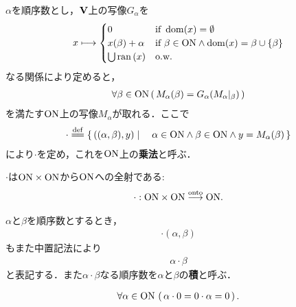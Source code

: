 	\begin{screen}
		\begin{dfn}[順序数の乗法]
			$\alpha$を順序数とし，$\mathbf{V}$上の写像$G_\alpha$を
			\begin{align}
				x \longmapsto 
				\begin{cases}
					0 & \mbox{if } \operatorname{dom}(x) = \emptyset \\
					x(\beta) + \alpha & \mbox{if } \beta \in \mathrm{ON} \wedge \operatorname{dom}(x) = \beta \cup \{\beta\} \\
					\bigcup \operatorname*{ran} \left(x\right) & \mbox{o.w.}
				\end{cases}
			\end{align}
			なる関係により定めると，
			\begin{align}
				\forall \beta \in \mathrm{ON}\, (\, M_\alpha(\beta) = G_\alpha(M_\alpha|_\beta)\, )
			\end{align}
			を満たす$\mathrm{ON}$上の写像$M_\alpha$が取れる．ここで
			\begin{align}
				\cdot \defeq \Set{((\alpha,\beta),y)}{\alpha \in \ON \wedge \beta \in \ON \wedge y = M_\alpha (\beta)}
			\end{align}
			により$\cdot$を定め，これを$\mathrm{ON}$上の{\bf 乗法}と呼ぶ．
		\end{dfn}
	\end{screen}
	
	\begin{screen}
		\begin{thm}\label{thm:multiplication_on_ordinal_numbers_is_a_mapping}
			$\cdot$は$\mathrm{ON} \times \mathrm{ON}$から$\mathrm{ON}$への全射である:
			\begin{align}
				\cdot:\mathrm{ON} \times \mathrm{ON} \overset{\mathrm{onto}}{\longrightarrow} \mathrm{ON}.
			\end{align}
		\end{thm}
	\end{screen}
	
	$\alpha$と$\beta$を順序数とするとき，
	\begin{align}
		\cdot(\alpha,\beta)
	\end{align}
	もまた中置記法により
	\begin{align}
		\alpha \cdot \beta
	\end{align}
	と表記する．また$\alpha \cdot \beta$なる順序数を$\alpha$と$\beta$の{\bf 積}と呼ぶ．
	
	\begin{screen}
		\begin{thm}[$0$を掛けたら$0$]
			\begin{align}
				\forall \alpha \in \mathrm{ON}\, \left(\, \alpha \cdot 0 = 0 \cdot \alpha = 0\, \right).
			\end{align}
		\end{thm}
	\end{screen}
	
